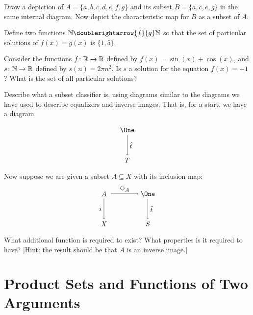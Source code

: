 \begin{exercises}
	\begin{nextexercise}
	\item Draw a depiction of $A=\{a,b,c,d,e,f,g\}$ and its subset $B=\{a,c,e,g\}$ in the same internal diagram. Now depict the characteristic map for $B$ as a subset of $A$.
	
	\item Define two functions $\NN\doublerightarrow{f}{g}\NN$ so that the set of particular solutions of $f(x)=g(x)$ is $\{1,5\}$. 
	
	\item Consider the functions ${f}\colon{\mathbb R}\to{\mathbb R}$ defined by $f(x) = \sin(x) + \cos(x)$, and ${s}\colon{\mathbb N}\to{\mathbb R}$ defined by $s(n) = 2\pi n^2$. 
	Is $s$ a solution for the equation $f(x) = -1$? 
	What is the set of all particular solutions?
	
	\item Describe what a subset classifier is, using diagrams similar to the diagrams we have used to describe equalizers and inverse images.
	That is, for a start, we have a diagram
	\[
		\begin{tikzpicture}
	\matrix (m) [row sep=3em,column sep=4em,minimum width=2em]
	{
		\node (one) {$\One$};\\
		\node (S) {$T$};\\
	};
	\draw[->] (one.south) -- node[anchor=west]  {$\hat t$} (S.north);
	\end{tikzpicture}
	\]
	Now suppose we are given a subset $A\subseteq X$ with its inclusion map:
		\[
		\begin{tikzpicture}
		\matrix (m) [row sep=3em,column sep=4em,minimum width=2em]
		{
			\node (A) {$A$}; & \node (one) {$\One$};\\
			\node (X) {$X$}; & \node (S) {$S$};\\
		};
		\draw[->] (A.east) -- node[anchor=south] {$\Diamond_A$} (one.west);
		\draw[->] (A.south) -- node[anchor=east]  {$i$} (X.north);
		\draw[->] (one.south) -- node[anchor=west]  {$\hat t$} (S.north);
		\end{tikzpicture}
		\]
	What additional function is required to exist? What properties is it required to have? [Hint: the result should be that $A$ is an inverse image.]
	\end{nextexercise}
\end{exercises}

\section{Product Sets and Functions of Two Arguments}

